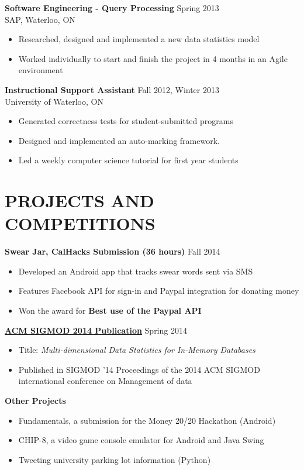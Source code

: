 \documentclass[margin]{res}
\begin{document}
\begin{resume}
{\bf Software Engineering - Query Processing}  \hfill  Spring 2013 \\ SAP, Waterloo, ON
\begin{itemize} \itemsep -2pt %
\item Researched, designed and implemented a new data statistics model
\item {\mbox Worked individually to start and finish the project in 4 months in an Agile environment}
\end{itemize}

{\bf Instructional Support Assistant} \hfill Fall 2012, Winter 2013 \\
University of Waterloo, ON               
\begin{itemize} \itemsep -2pt
\item  Generated correctness tests for student-submitted programs
\item  Designed and implemented an auto-marking framework.
\item  Led a weekly computer science tutorial for first year students
\end{itemize}




\section{PROJECTS \newline AND COMPETITIONS}
{\bf Swear Jar, CalHacks Submission (36 hours)} \hfill Fall 2014
\begin{itemize} \itemsep -2pt
\item Developed an Android app that tracks swear words sent via SMS
\item Features Facebook API for sign-in and Paypal integration for donating money
\item Won the award for {\bf Best use of the Paypal API} 	
\end{itemize}

\href{http://dl.acm.org/citation.cfm?id=2612663}{\bf ACM SIGMOD 2014 Publication} 
\hfill Spring 2014
\begin{itemize} \itemsep -2pt
\item Title: \textit{Multi-dimensional Data Statistics for In-Memory Databases}
\item Published in SIGMOD '14 Proceedings of the 2014 ACM SIGMOD international conference on Management of data
\end{itemize}

{\bf Other Projects}
\begin{itemize} \itemsep -2pt
\item Fundamentals, a submission for the Money 20/20 Hackathon (Android)
\item CHIP-8, a video game console emulator for Android and Java Swing
\item Tweeting university parking lot information (Python)
\end{itemize}

\end{resume} 
\end{document}
